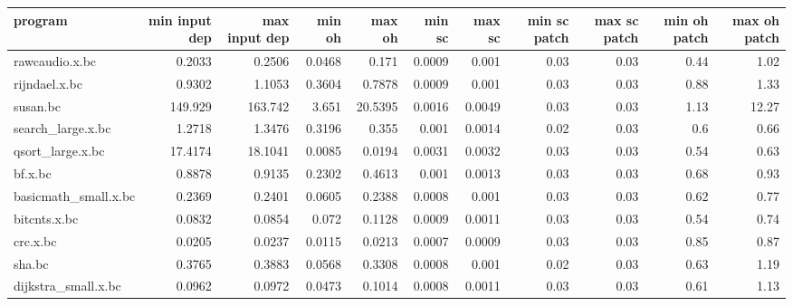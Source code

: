 \begin{tabular}{lrrrrrrrrrr}
\hline
 program              &   min input dep &   max input dep &   min oh &   max oh &   min sc &   max sc &   min sc patch &   max sc patch &   min oh patch &   max oh patch \\
\hline
 rawcaudio.x.bc       &          0.2033 &          0.2506 &   0.0468 &   0.171  &   0.0009 &   0.001  &           0.03 &           0.03 &           0.44 &           1.02 \\
 rijndael.x.bc        &          0.9302 &          1.1053 &   0.3604 &   0.7878 &   0.0009 &   0.001  &           0.03 &           0.03 &           0.88 &           1.33 \\
 susan.bc             &        149.929  &        163.742  &   3.651  &  20.5395 &   0.0016 &   0.0049 &           0.03 &           0.03 &           1.13 &          12.27 \\
 search\_large.x.bc    &          1.2718 &          1.3476 &   0.3196 &   0.355  &   0.001  &   0.0014 &           0.02 &           0.03 &           0.6  &           0.66 \\
 qsort\_large.x.bc     &         17.4174 &         18.1041 &   0.0085 &   0.0194 &   0.0031 &   0.0032 &           0.03 &           0.03 &           0.54 &           0.63 \\
 bf.x.bc              &          0.8878 &          0.9135 &   0.2302 &   0.4613 &   0.001  &   0.0013 &           0.03 &           0.03 &           0.68 &           0.93 \\
 basicmath\_small.x.bc &          0.2369 &          0.2401 &   0.0605 &   0.2388 &   0.0008 &   0.001  &           0.03 &           0.03 &           0.62 &           0.77 \\
 bitcnts.x.bc         &          0.0832 &          0.0854 &   0.072  &   0.1128 &   0.0009 &   0.0011 &           0.03 &           0.03 &           0.54 &           0.74 \\
 crc.x.bc             &          0.0205 &          0.0237 &   0.0115 &   0.0213 &   0.0007 &   0.0009 &           0.03 &           0.03 &           0.85 &           0.87 \\
 sha.bc               &          0.3765 &          0.3883 &   0.0568 &   0.3308 &   0.0008 &   0.001  &           0.02 &           0.03 &           0.63 &           1.19 \\
 dijkstra\_small.x.bc  &          0.0962 &          0.0972 &   0.0473 &   0.1014 &   0.0008 &   0.0011 &           0.03 &           0.03 &           0.61 &           1.13 \\

\end{tabular}
